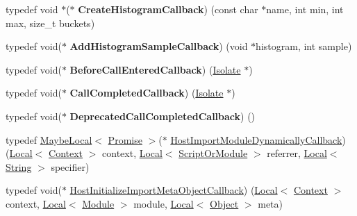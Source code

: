 \begin{DoxyCompactItemize}
\mbox{\label{namespacev8_aafbf15734701792a14c02dbca7535b75}} 
typedef void $\ast$($\ast$ {\bfseries Create\+Histogram\+Callback}) (const char $\ast$name, int min, int max, size\+\_\+t buckets)
\item 
\mbox{\label{namespacev8_a5a7c6bb8050ad84f0a453056ec325d1c}} 
typedef void($\ast$ {\bfseries Add\+Histogram\+Sample\+Callback}) (void $\ast$histogram, int sample)
\item 
\mbox{\label{namespacev8_abe10f58d37b0736a292a6c7f180fb40c}} 
typedef void($\ast$ {\bfseries Before\+Call\+Entered\+Callback}) (\mbox{\hyperlink{classv8_1_1Isolate}{Isolate}} $\ast$)
\item 
\mbox{\label{namespacev8_a5003dc8cb6a81f522a9c6b05b98d9e34}} 
typedef void($\ast$ {\bfseries Call\+Completed\+Callback}) (\mbox{\hyperlink{classv8_1_1Isolate}{Isolate}} $\ast$)
\item 
\mbox{\label{namespacev8_a878e6b3a304e7bcbc155a16fef8400f1}} 
typedef void($\ast$ {\bfseries Deprecated\+Call\+Completed\+Callback}) ()
\item 
typedef \mbox{\hyperlink{classv8_1_1MaybeLocal}{Maybe\+Local}}$<$ \mbox{\hyperlink{classv8_1_1Promise}{Promise}} $>$($\ast$ \mbox{\hyperlink{namespacev8_a327d89ea1fb89b4ada3571a3571413cc}{Host\+Import\+Module\+Dynamically\+Callback}}) (\mbox{\hyperlink{classv8_1_1Local}{Local}}$<$ \mbox{\hyperlink{classv8_1_1Context}{Context}} $>$ context, \mbox{\hyperlink{classv8_1_1Local}{Local}}$<$ \mbox{\hyperlink{classv8_1_1ScriptOrModule}{Script\+Or\+Module}} $>$ referrer, \mbox{\hyperlink{classv8_1_1Local}{Local}}$<$ \mbox{\hyperlink{classv8_1_1String}{String}} $>$ specifier)
\item 
typedef void($\ast$ \mbox{\hyperlink{namespacev8_a46fe0379312fafd495b9be892b2de443}{Host\+Initialize\+Import\+Meta\+Object\+Callback}}) (\mbox{\hyperlink{classv8_1_1Local}{Local}}$<$ \mbox{\hyperlink{classv8_1_1Context}{Context}} $>$ context, \mbox{\hyperlink{classv8_1_1Local}{Local}}$<$ \mbox{\hyperlink{classv8_1_1Module}{Module}} $>$ module, \mbox{\hyperlink{classv8_1_1Local}{Local}}$<$ \mbox{\hyperlink{classv8_1_1Object}{Object}} $>$ meta)
\item 
\mbox{\label{namespacev8_aeda0e5e4b76557ec99b0ebb56f7b3f9e}} 

\end{DoxyCompactItemize}

